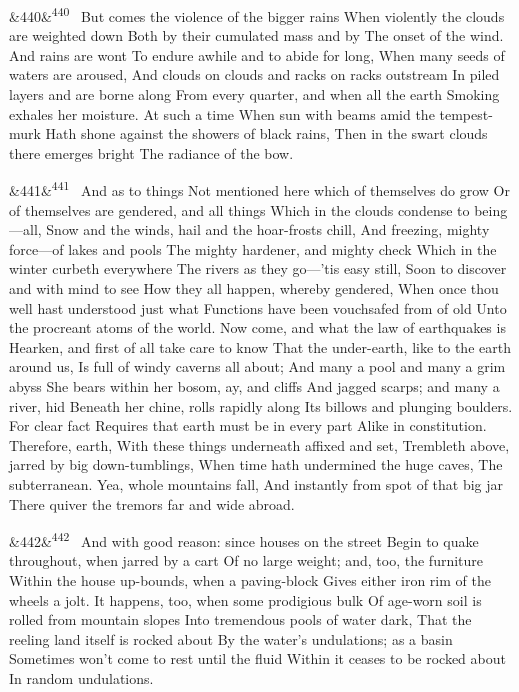 \documentclass[12pt]{article}
\newcommand{\para}[1][]{\par\noindent\ifx&#1&\else\textsuperscript{\footnotesize #1}~\fi}
\begin{document}
\para[440] But comes the violence of the bigger rains When violently the clouds are weighted down Both by their cumulated mass and by The onset of the wind. And rains are wont To endure awhile and to abide for long, When many seeds of waters are aroused, And clouds on clouds and racks on racks outstream In piled layers and are borne along From every quarter, and when all the earth Smoking exhales her moisture. At such a time When sun with beams amid the tempest-murk Hath shone against the showers of black rains, Then in the swart clouds there emerges bright The radiance of the bow.

\para[441] And as to things Not mentioned here which of themselves do grow Or of themselves are gendered, and all things Which in the clouds condense to being---all, Snow and the winds, hail and the hoar-frosts chill, And freezing, mighty force---of lakes and pools The mighty hardener, and mighty check Which in the winter curbeth everywhere The rivers as they go---'tis easy still, Soon to discover and with mind to see How they all happen, whereby gendered, When once thou well hast understood just what Functions have been vouchsafed from of old Unto the procreant atoms of the world. Now come, and what the law of earthquakes is Hearken, and first of all take care to know That the under-earth, like to the earth around us, Is full of windy caverns all about; And many a pool and many a grim abyss She bears within her bosom, ay, and cliffs And jagged scarps; and many a river, hid Beneath her chine, rolls rapidly along Its billows and plunging boulders. For clear fact Requires that earth must be in every part Alike in constitution. Therefore, earth, With these things underneath affixed and set, Trembleth above, jarred by big down-tumblings, When time hath undermined the huge caves, The subterranean. Yea, whole mountains fall, And instantly from spot of that big jar There quiver the tremors far and wide abroad.

\para[442] And with good reason: since houses on the street Begin to quake throughout, when jarred by a cart Of no large weight; and, too, the furniture Within the house up-bounds, when a paving-block Gives either iron rim of the wheels a jolt. It happens, too, when some prodigious bulk Of age-worn soil is rolled from mountain slopes Into tremendous pools of water dark, That the reeling land itself is rocked about By the water's undulations; as a basin Sometimes won't come to rest until the fluid Within it ceases to be rocked about In random undulations.
\end{document}
